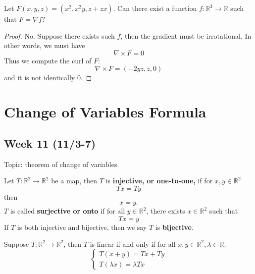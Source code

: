 \documentclass[openany]{book}
\newcommand{\R}{\mathbb{R}}
\begin{document}
\begin{prob}
    Let $F(x,y,z)=(x^2, x^2y, z+zx)$. Can there exist a function $f:\R^3\to\R$ such that $F=\nabla f$?
\end{prob}
\begin{proof}
    No. Suppose there exists such $f$, then the gradient must be irrotational. In other words, we must have 
    \begin{equation*}
        \nabla\times F=0
    \end{equation*}
    Thus we compute the curl of $F$:
    \begin{equation*}
        \nabla\times F=(-2yz, z, 0)
    \end{equation*}
    and it is not identically $0$.
\end{proof}






\chapter{Change of Variables Formula}


\section*{\centering Week 11 (11/3-7)}

\noindent
Topic: theorem of change of variables.



\begin{defn}
    Let $T:\R^2\to\R^2$ be a map, then $T$ is \textbf{injective, or one-to-one,} if for $x,y\in\R^2$
    \begin{equation*}
        Tx=Ty
    \end{equation*}
    then
    \begin{equation*}
        x=y.
    \end{equation*}
    $T$ is called \textbf{surjective or onto} if for all $y\in\R^2$, there exists $x\in\R^2$ such that 
    \begin{equation*}
        Tx=y
    \end{equation*}
    If $T$ is both injective and bijective, then we say $T$ is \textbf{bijective}.
\end{defn}

\begin{defn}
    Suppose $T:\R^2\to\R^2$, then $T$ is linear if and only if for all $x,y\in\R^2, \lambda\in\R$.
    \begin{equation*}
        \begin{cases}
            T(x+y)=Tx+Ty\\
            T(\lambda x)=\lambda Tx
        \end{cases}
    \end{equation*}
\end{defn}
\end{document}
